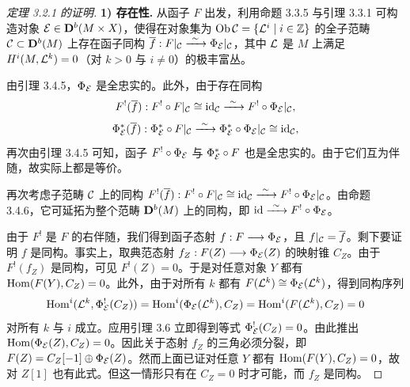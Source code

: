 \begin{proof}[定理 3.2.1 的证明]
\textbf{1) 存在性.} 从函子 $F$ 出发，利用命题 3.3.5 与引理 3.3.1 可构造对象 $\mathcal{E}\in\mathbf{D}^{b}(M\times X)$，使得在对象集为 $\operatorname{Ob}\mathcal{C}=\{\mathcal{L}^{i}\mid i\in\mathbb{Z}\}$ 的全子范畴 $\mathcal{C}\subset\mathbf{D}^{b}(M)$ 上存在函子同构 $\overline{f}:F|_{\mathcal{C}}\xrightarrow{\ \sim\ }\Phi_{\mathcal{E}}|_{\mathcal{C}}$，其中 $\mathcal{L}$ 是 $M$ 上满足 $H^{i}(M,\mathcal{L}^{k})=0$（对 $k>0$ 与 $i\neq 0$）的极丰富丛。

由引理 3.4.5，$\Phi_{\mathcal{E}}$ 是全忠实的。此外，由于存在同构
\begin{equation*}
F^{!}(\overline{f}):F^{!}\circ F|_{\mathcal{C}}\cong\mathrm{id}_{\mathcal{C}}\xrightarrow{\ \sim\ } F^{!}\circ\Phi_{\mathcal{E}}|_{\mathcal{C}},
\end{equation*}
\begin{equation*}
\Phi_{\mathcal{E}}^{*}(\overline{f}):\Phi_{\mathcal{E}}^{*}\circ F|_{\mathcal{C}}\xrightarrow{\ \sim\ }\Phi_{\mathcal{E}}^{*}\circ\Phi_{\mathcal{E}}|_{\mathcal{C}}\cong\mathrm{id}_{\mathcal{C}},
\end{equation*}
再次由引理 3.4.5 可知，函子 $F^{!}\circ\Phi_{\mathcal{E}}$ 与 $\Phi_{\mathcal{E}}^{*}\circ F$ 也是全忠实的。由于它们互为伴随，故实际上都是等价。

再次考虑子范畴 $\mathcal{C}$ 上的同构 $F^{!}(\overline{f}):F^{!}\circ F|_{\mathcal{C}}\cong\mathrm{id}_{\mathcal{C}}\xrightarrow{\ \sim\ } F^{!}\circ\Phi_{\mathcal{E}}|_{\mathcal{C}}$。由命题 3.4.6，它可延拓为整个范畴 $\mathbf{D}^{b}(M)$ 上的同构，即 $\mathrm{id}\xrightarrow{\ \sim\ } F^{!}\circ\Phi_{\mathcal{E}}$。

由于 $F^{!}$ 是 $F$ 的右伴随，我们得到函子态射 $f:F\longrightarrow\Phi_{\mathcal{E}}$，且 $f|_{\mathcal{C}}=\overline{f}$。剩下要证明 $f$ 是同构。事实上，取典范态射 $f_Z:F(Z)\longrightarrow\Phi_{\mathcal{E}}(Z)$ 的映射锥 $C_Z$。由于 $F^{!}(f_Z)$ 是同构，可见 $F^{!}(Z)=0$。于是对任意对象 $Y$ 都有 $\operatorname{Hom}(F(Y),C_Z)=0$。此外，由于对所有 $k$ 都有 $F(\mathcal{L}^{k})\cong\Phi_{\mathcal{E}}(\mathcal{L}^{k})$，得到同构序列
\begin{equation*}
\operatorname{Hom}^{i}(\mathcal{L}^{k},\Phi_{\mathcal{E}}^{!}(C_Z))=\operatorname{Hom}^{i}(\Phi_{\mathcal{E}}(\mathcal{L}^{k}),C_Z)=\operatorname{Hom}^{i}(F(\mathcal{L}^{k}),C_Z)=0
\end{equation*}
对所有 $k$ 与 $i$ 成立。应用引理 3.6 立即得到等式 $\Phi_{\mathcal{E}}^{!}(C_Z)=0$。由此推出 $\operatorname{Hom}(\Phi_{\mathcal{E}}(Z),C_Z)=0$。因此关于态射 $f_Z$ 的三角必须分裂，即 $F(Z)=C_Z[-1]\oplus\Phi_{\mathcal{E}}(Z)$。然而上面已证对任意 $Y$ 都有 $\operatorname{Hom}(F(Y),C_Z)=0$，故对 $Z[1]$ 也有此式。但这一情形只有在 $C_Z=0$ 时才可能，而 $f_Z$ 是同构。



\end{proof}
